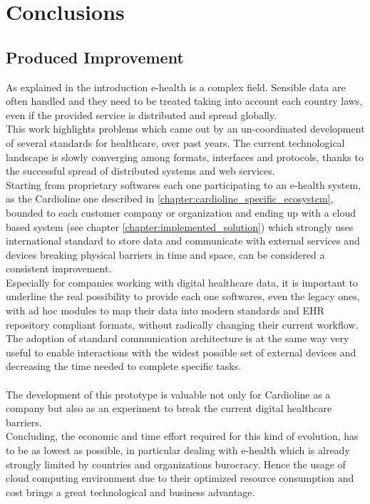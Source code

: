 \chapter{Conclusions}
\section{Produced Improvement}
As explained in the introduction e-health is a complex field. Sensible data are often handled and they need to be treated taking into account each country laws, even if the provided service is distributed and spread globally.\\
This work highlights problems which came out by an un-coordinated development of several standards for healthcare, over past years. The current technological landscape is slowly converging among formats, interfaces and protocols, thanks to the successful spread of distributed systems and web services.\\
Starting from proprietary softwares each one participating to an e-health system, as the Cardioline one described in \ref{chapter:cardioline_specific_ecosystem}, bounded to each customer company or organization and ending up with a cloud based system (see chapter \ref{chapter:implemented_solution}) which strongly uses international standard to store data and communicate with external services and devices breaking physical barriers in time and space, can be considered a consistent improvement.\\
Especially for companies working with digital healthcare data, it is important to underline the real possibility to provide each one softwares, even the legacy ones, with ad hoc modules to map their data into modern standards and EHR repository compliant formats, without radically changing their current workflow.
The adoption of standard communication architecture is at the same way very useful to enable interactions with the widest possible set of external devices and decreasing the time needed to complete specific tasks.\\ \\
The development of this prototype is valuable not only for Cardioline as a company but also as an experiment to break the current digital healthcare barriers.\\
Concluding, the economic and time effort required for this kind of evolution, has to be as lowest as possible, in particular dealing with e-health which is already strongly limited by countries and organizations burocracy. Hence the usage of cloud computing environment due to their optimized resource consumption and cost brings a great technological and business advantage.

